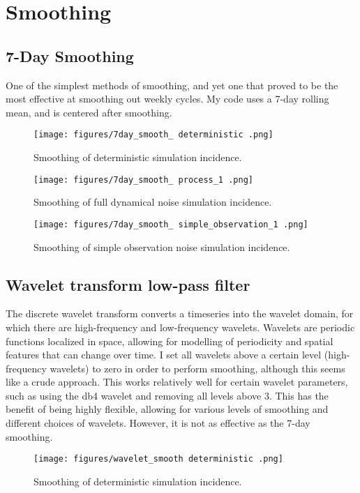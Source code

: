 \documentclass{article}
\begin{document}
\section{Smoothing}

\subsection{7-Day Smoothing}
One of the simplest methods of smoothing, and yet one that proved to be the most effective at smoothing out weekly cycles. My code uses a 7-day rolling mean, and is centered after smoothing.

\clearpage
\begin{figure}[h!]
    \centering
    \texttt{[image: figures/7day\_smooth\_ deterministic .png]}
    \caption{Smoothing of deterministic simulation incidence.}
\end{figure}


\clearpage
\begin{figure}[h!]
    \centering
    \texttt{[image: figures/7day\_smooth\_ process\_1 .png]}
    \caption{Smoothing of full dynamical noise simulation incidence.}
\end{figure}

\clearpage
\begin{figure}[h!]
    \centering
    \texttt{[image: figures/7day\_smooth\_ simple\_observation\_1 .png]}
    \caption{Smoothing of simple observation noise simulation incidence.}
\end{figure}

\subsection{Wavelet transform low-pass filter}
The discrete wavelet transform converts a timeseries into the wavelet domain, for which there are high-frequency and low-frequency wavelets. Wavelets are periodic functions localized in space, allowing for modelling of periodicity and spatial features that can change over time. I set all wavelets above a certain level (high-frequency wavelets) to zero in order to perform smoothing, although this seems like a crude approach. This works relatively well for certain wavelet parameters, such as using the db4 wavelet and removing all levels above 3. This has the benefit of being highly flexible, allowing for various levels of smoothing and different choices of wavelets. However, it is not as effective as the 7-day smoothing.

\clearpage
\begin{figure}[h!]
    \centering
    \texttt{[image: figures/wavelet\_smooth deterministic .png]}
    \caption{Smoothing of deterministic simulation incidence.}
\end{figure}
\end{document}
